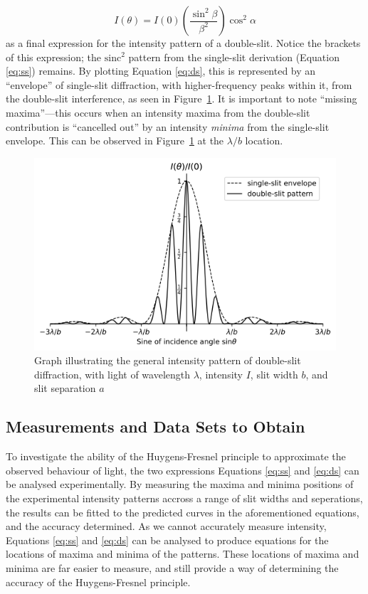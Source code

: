 \documentclass[a4paper]{article}
\begin{document}
\begin{equation} \label{eq:ds}
I(\theta)=I(0)\left(\frac{\sin^2\beta}{\beta^2}\right)\cos^2\alpha
\end{equation} as a final expression for the intensity pattern of a double-slit. Notice the brackets of this expression; the $\text{sinc}^2$ pattern from the single-slit derivation (Equation \ref{eq:ss}) remains. By plotting Equation \ref{eq:ds}, this is represented by an ``envelope'' of single-slit diffraction, with higher-frequency peaks within it, from the double-slit interference, as seen in Figure~\ref{fig:doubledemo}. It is important to note ``missing maxima''---this occurs when an intensity maxima from the double-slit contribution is ``cancelled out'' by an intensity {\it minima} from the single-slit envelope. This can be observed in Figure~\ref{fig:doubledemo} at the $\lambda/b$ location.

\begin{figure}[h]
  \centerline{\includegraphics[scale=0.7]{ds_demo.png}}
  \captionsetup{justification=centering}
  \caption{Graph illustrating the general intensity pattern of double-slit diffraction, with light of wavelength $\lambda$, intensity $I$, slit width $b$, and slit separation $a$}
  \label{fig:doubledemo}
\end{figure}

\subsection{Measurements and Data Sets to Obtain}

To investigate the ability of the Huygens-Fresnel principle to approximate the observed behaviour of light, the two expressions Equations \ref{eq:ss} and \ref{eq:ds} can be analysed experimentally. By measuring the maxima and minima positions of the experimental intensity patterns accross a range of slit widths and seperations, the results can be fitted to the predicted curves in the aforementioned equations, and the accuracy determined. As we cannot accurately measure intensity, Equations \ref{eq:ss} and \ref{eq:ds} can be analysed to produce equations for the locations of maxima and minima of the patterns. These locations of maxima and minima are far easier to measure, and still provide a way of determining the accuracy of the Huygens-Fresnel principle.
\clearpage
\end{document}
